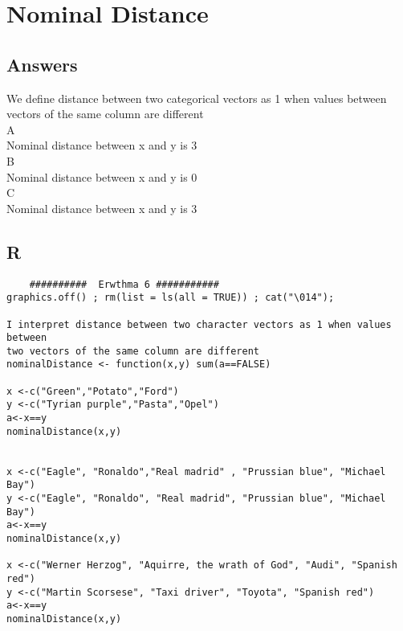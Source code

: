 \documentclass[10pt,towside,a4paper]{article}
\begin{document}
\section{Nominal Distance}
\subsection{Answers}
We define distance between two categorical vectors as 1 when values between vectors of the same column are different\\
A\\
Nominal distance between x and y is 3 \\
B\\
Nominal distance between x and y is 0 \\
C\\
Nominal distance between x and y is 3 \\

\subsection{R}
\begin{lstlisting}
	##########  Erwthma 6 ###########
graphics.off() ; rm(list = ls(all = TRUE)) ; cat("\014");
	
I interpret distance between two character vectors as 1 when values between
two vectors of the same column are different
nominalDistance <- function(x,y) sum(a==FALSE)
	
x <-c("Green","Potato","Ford")
y <-c("Tyrian purple","Pasta","Opel")
a<-x==y
nominalDistance(x,y)
	
	
x <-c("Eagle", "Ronaldo","Real madrid" , "Prussian blue", "Michael Bay")
y <-c("Eagle", "Ronaldo", "Real madrid", "Prussian blue", "Michael Bay")
a<-x==y
nominalDistance(x,y)
	
x <-c("Werner Herzog", "Aquirre, the wrath of God", "Audi", "Spanish red")
y <-c("Martin Scorsese", "Taxi driver", "Toyota", "Spanish red")
a<-x==y
nominalDistance(x,y)
\end{lstlisting}
\newpage
\end{document}
